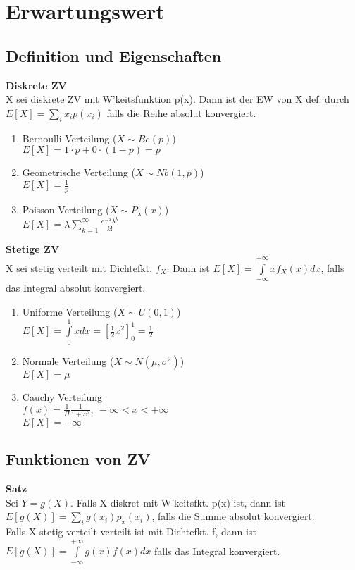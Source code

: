 \documentclass[10pt, a4paper, twocolumn]{scrartcl}
\begin{document}
\section{Erwartungswert}

\subsection{Definition und Eigenschaften}

\textbf{Diskrete ZV}\\
X sei diskrete ZV mit W'keitsfunktion p(x). Dann ist der EW von X def. durch $E[X]=\sum\limits_i x_ip(x_i)$ falls die Reihe absolut konvergiert.

\begin{enumerate}
 \item Bernoulli Verteilung ($X\sim Be(p)$)\\
  $E[X]=1\cdotp p + 0\cdotp(1-p)=p$
 \item Geometrische Verteilung ($X\sim Nb(1,p)$)\\
  $E[X]=\frac{1}{p}$
 \item Poisson Verteilung ($X\sim P_{\lambda}(x)$)\\
  $E[X]=\lambda\sum\limits^\infty_{k=1}\frac{e^{-\lambda}\lambda^k}{k!}$
\end{enumerate}

\textbf{Stetige ZV}\\
X sei stetig verteilt mit Dichtefkt. $f_X$. Dann ist $E[X]=\int\limits^{+\infty}_{-\infty}x f_X(x)dx$, falls das Integral absolut konvergiert.

\begin{enumerate}
 \item Uniforme Verteilung ($X\sim U(0,1)$)\\
  $E[X]=\int\limits^1_0 xdx=[\frac{1}{2}x^2]^1_0=\frac{1}{2}$
 \item Normale Verteilung ($X \sim N(\mu,\sigma^2)$)\\
  $E[X]=\mu$
 \item Cauchy Verteilung\\
  $f(x)=\frac{1}{\Pi}\frac{1}{1+x^2},\: -\infty<x<+\infty$\\
  $E[X]=+\infty$
\end{enumerate}

\subsection{Funktionen von ZV}

\textbf{Satz}\\
Sei $Y=g(X)$.
Falls X diskret mit W'keitsfkt. p(x) ist, dann ist $E[g(X)]=\sum\limits_i g(x_i)p_x(x_i)$, falls die Summe absolut konvergiert.\\
Falls X stetig verteilt verteilt ist mit Dichtefkt. f, dann ist $E[g(X)]=\int\limits^{+\infty}_{-\infty}g(x)f(x)dx$ falls das Integral konvergiert.\\\\
\end{document}
